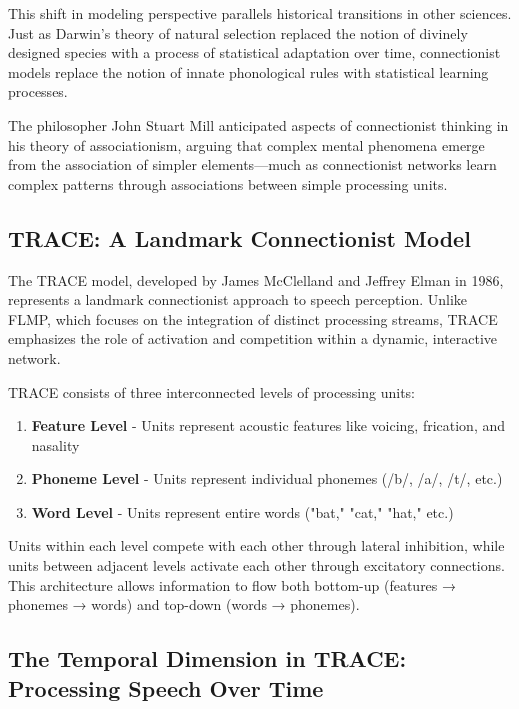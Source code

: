 \documentclass[12pt,a4paper]{article}
\begin{document}
This shift in modeling perspective parallels historical transitions in other sciences. Just as Darwin's theory of natural selection replaced the notion of divinely designed species with a process of statistical adaptation over time, connectionist models replace the notion of innate phonological rules with statistical learning processes.

The philosopher John Stuart Mill anticipated aspects of connectionist thinking in his theory of associationism, arguing that complex mental phenomena emerge from the association of simpler elements—much as connectionist networks learn complex patterns through associations between simple processing units.

\subsection{TRACE: A Landmark Connectionist Model}

The TRACE model, developed by James McClelland and Jeffrey Elman in 1986, represents a landmark connectionist approach to speech perception. Unlike FLMP, which focuses on the integration of distinct processing streams, TRACE emphasizes the role of activation and competition within a dynamic, interactive network.

\begin{tcolorbox}[enhanced, colback=purple!5, colframe=purple!75!black, title=The TRACE Architecture]
TRACE consists of three interconnected levels of processing units:

\begin{enumerate}
\item \textbf{Feature Level} - Units represent acoustic features like voicing, frication, and nasality
\item \textbf{Phoneme Level} - Units represent individual phonemes (/b/, /a/, /t/, etc.)
\item \textbf{Word Level} - Units represent entire words ("bat," "cat," "hat," etc.)
\end{enumerate}

Units within each level compete with each other through lateral inhibition, while units between adjacent levels activate each other through excitatory connections. This architecture allows information to flow both bottom-up (features → phonemes → words) and top-down (words → phonemes).
\end{tcolorbox}
\subsection{The Temporal Dimension in TRACE: Processing Speech Over Time}
\end{document}
